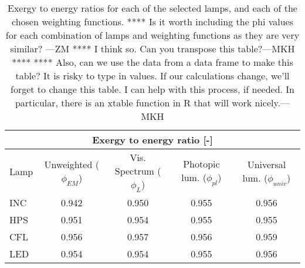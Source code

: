 

\begin{table}
\centering %
\caption{Exergy to energy ratios for each of the selected lamps, and each of the chosen weighting functions. **** Is it worth including the phi values for each combination of lamps and weighting functions as they are very similar? ---ZM ****
I think so. Can you transpose this table?---MKH ****
**** Also, can we use the data from a data frame to make this table?
It is risky to type in values. If our calculations change, we'll forget to change this table.
I can help with this process, if needed.  
In particular, there is an xtable function in R that will work nicely.---MKH}
\begin{tabular}{l c c c c}
\toprule
\multicolumn{5}{c}{Exergy to energy ratio [-]} \\
\midrule
  Lamp 
      & Unweighted ($\phi_{EM}$)
      & Vis. Spectrum ($\phi_{L}$)
      & Photopic lum. ($\phi_{pl}$)
      & Universal lum. ($\phi_{univ}$)  \\
\midrule
  INC & 0.942 & 0.950 & 0.955 & 0.956 \\
  HPS & 0.951 & 0.954 & 0.955 & 0.955 \\
  CFL & 0.956 & 0.957 & 0.956 & 0.959 \\
  LED & 0.954 & 0.954 & 0.955 & 0.956 \\
\bottomrule
\end{tabular}
\label{tab:results_phi}
\end{table}